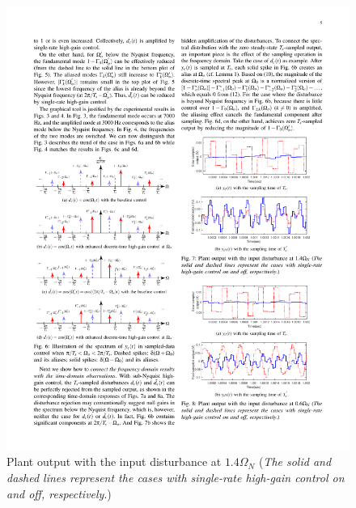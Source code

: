 \documentclass [11pt, proquest] {uwthesis}[2020/02/24]
\begin{document}
\begin{figure}[!ht]
\begin{centering}
{\begin{centering}
\includegraphics[width=13cm]{Spectral-analysis/FIG7b.pdf}
\par\end{centering}
}
\par\end{centering}
\caption{\label{fig:Plant-output-for-3}Plant output with the input disturbance
at $1.4\Omega_{N}$ (\emph{The solid and dashed lines represent the
cases with single-rate high-gain control on and off, respectively}.)}
\end{figure}
\end{document}
